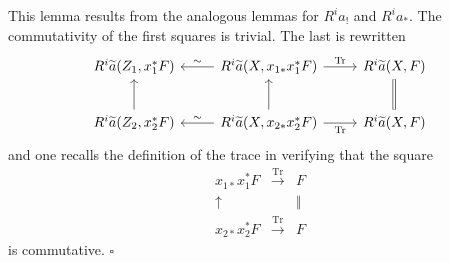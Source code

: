 \documentclass[10pt]{article}
\newcommand{\Tr}{\operatorname{Tr}}
\newcommand{\QED}{\hfill$\square$}
\begin{document}
This lemma results from the analogous lemmas for $R^ia_!$ and $R^ia_*$. The commutativity of the first squares is trivial. The last is rewritten
\begin{equation*}
\begin{tikzcd}[column sep=2.4em,row sep=2.2em]
R^i\widetilde a(Z_1,x_1^*F) &
R^i\widetilde a(X,x_{1*}x_1^*F) \arrow[l,"\sim"'] \arrow[r,"\Tr"] &
R^i\widetilde a(X,F) \\
R^i\widetilde a(Z_2,x_2^*F) \arrow[u] &
R^i\widetilde a(X,x_{2*}x_2^*F) \arrow[l,"\sim"'] \arrow[u] \arrow[r,"\Tr"'] &
R^i\widetilde a(X,F) \arrow[u,equal]
\end{tikzcd}
\end{equation*}
and one recalls the definition of the trace in verifying that the square
\[
\begin{array}{ccc}
x_{1*}x_1^*F&\xrightarrow{\Tr}&F\\
\uparrow&&\Vert\\
x_{2*}x_2^*F&\xrightarrow{\Tr}&F
\end{array}
\]
is commutative. \QED
\end{document}
